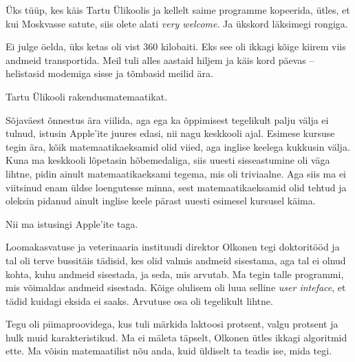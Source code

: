 
Üks tüüp, kes käis Tartu Ülikoolis ja kellelt saime programme kopeerida, 
ütles, et kui Moskvasse satute, siis olete alati \emph{very welcome}. 
Ja ükskord läksimegi rongiga.


Ei julge öelda, üks ketas oli vist 360 kilobaiti. Eks see oli 
ikkagi kõige kiirem viis andmeid transportida. Meil tuli alles
aastaid hiljem ja käis kord päevas -- helistasid modemiga 
sisse ja tõmbasid meilid ära.


Tartu Ülikooli rakendusmatemaatikat. 


Sõjaväest õnnestus ära viilida, aga ega ka õppimisest tegelikult palju välja ei tulnud, istusin Apple'ite juures edasi, nii nagu 
keskkooli ajal. Esimese kursuse tegin ära, kõik matemaatikaeksamid olid viied, aga inglise keelega kukkusin välja. Kuna ma keskkooli lõpetasin hõbemedaliga, siis uuesti sisseastumine oli väga lihtne, pidin ainult matemaatikaeksami tegema, mis oli triviaalne. Aga siis ma ei viitsinud enam üldse 
loengutesse minna, sest matemaatikaeksamid olid tehtud ja oleksin pidanud 
ainult inglise keele pärast uuesti esimesel kursusel käima.

Nii ma istusingi Apple'ite taga. 

Loomakasvatuse ja veterinaaria instituudi direktor Olkonen tegi 
doktoritööd ja tal oli terve bussitäis tädisid, kes olid valmis andmeid 
sisestama, aga tal ei olnud kohta, kuhu andmeid sisestada, ja seda, mis arvutab. 
Ma tegin talle programmi, mis võimaldas andmeid sisestada. Kõige olulisem oli luua selline \emph{user inteface}, et tädid kuidagi eksida ei 
saaks. Arvutuse osa oli tegelikult 
lihtne.


Tegu oli piimaproovidega, kus tuli märkida laktoosi protsent, valgu protsent ja hulk 
muid karakteristikud. Ma ei mäleta täpselt, Olkonen ütles ikkagi
algoritmid ette. Ma võisin matemaatilist nõu anda, kuid
üldiselt ta teadis ise, mida tegi. 

